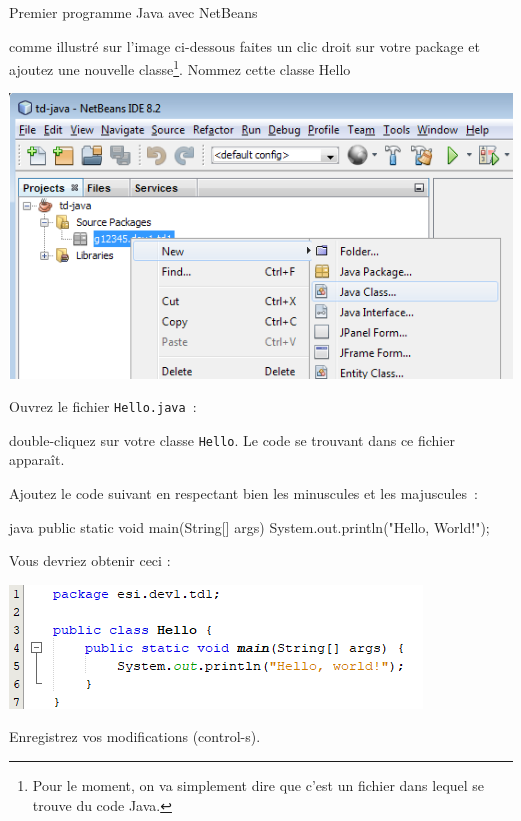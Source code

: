 \documentclass[a4paper,11pt]{article}
\begin{document}
\begin{Tutoriel}{Premier programme Java avec NetBeans}
\begin{steps}
			comme illustré sur l'image ci-dessous faites un clic droit sur votre package 
			et ajoutez une nouvelle classe\footnote{Pour le moment, 
			on va simplement dire que c'est un fichier dans lequel se trouve du code Java.}. 
			Nommez cette classe {Hello}
		
			\bigskip
			
			\begin{center}
				\includegraphics[width=\textwidth]{images/nb_newproject_new_class}
			\end{center}


		\item Ouvrez le fichier \texttt{Hello.java}~:
		
			double-cliquez sur votre classe \texttt{Hello}. 
			Le code se trouvant dans ce fichier apparaît.
			
%			
%			
			
			Ajoutez le code suivant en respectant bien les 
			minuscules et les majuscules~:
	
			\begin{Code}{java}
				public static void main(String[] args) {
					System.out.println("Hello, World!");
				}
			\end{Code}
			
			Vous devriez obtenir ceci :
			
			\begin{center}
				\includegraphics{images/nb_newproject_code}
			\end{center}
			Enregistrez vos modifications (control-s).
			

\end{steps}
\end{Tutoriel}
\end{document}
